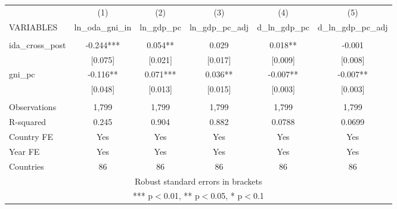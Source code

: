 \begin{tabular}{lccccc} \hline
 & (1) & (2) & (3) & (4) & (5) \\
VARIABLES & ln\_oda\_gni\_in & ln\_gdp\_pc & ln\_gdp\_pc\_adj & d\_ln\_gdp\_pc & d\_ln\_gdp\_pc\_adj \\ \hline
 &  &  &  &  &  \\
ida\_cross\_post & -0.244*** & 0.054** & 0.029 & 0.018** & -0.001 \\
 & [0.075] & [0.021] & [0.017] & [0.009] & [0.008] \\
gni\_pc & -0.116** & 0.071*** & 0.036** & -0.007** & -0.007** \\
 & [0.048] & [0.013] & [0.015] & [0.003] & [0.003] \\
 &  &  &  &  &  \\
Observations & 1,799 & 1,799 & 1,799 & 1,799 & 1,799 \\
R-squared & 0.245 & 0.904 & 0.882 & 0.0788 & 0.0699 \\
Country FE & Yes & Yes & Yes & Yes & Yes \\
Year FE & Yes & Yes & Yes & Yes & Yes \\
 Countries & 86 & 86 & 86 & 86 & 86 \\ \hline
\multicolumn{6}{c}{ Robust standard errors in brackets} \\
\multicolumn{6}{c}{ *** p$<$0.01, ** p$<$0.05, * p$<$0.1} \\
\end{tabular}
